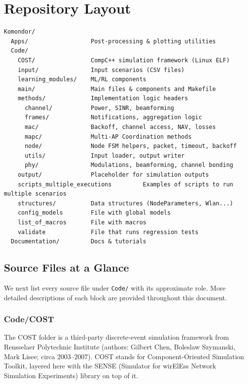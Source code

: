 \documentclass[11pt,a4paper]{article}
\begin{document}
\section{Repository Layout}
\label{sec:layout}

\begin{lstlisting}[language={},caption={Top-level directory tree.}]
Komondor/
  Apps/                  Post-processing & plotting utilities
  Code/
    COST/                CompC++ simulation framework (Linux ELF)
    input/               Input scenarios (CSV files)
    learning_modules/    ML/RL components
    main/                Main files & components and Makefile
    methods/             Implementation logic headers
      channel/           Power, SINR, beamforming
      frames/            Notifications, aggregation logic
      mac/               Backoff, channel access, NAV, losses
      mapc/              Multi-AP Coordination methods
      node/              Node FSM helpers, packet, timeout, backoff
      utils/             Input loader, output writer
      phy/               Modulations, beamforming, channel bonding
    output/              Placeholder for simulation outputs
    scripts_multiple_executions         Examples of scripts to run multiple scenarios
    structures/          Data structures (NodeParameters, Wlan...)
    config_models        File with global models
    list_of_macros       File with macros
    validate             File that runs regression tests
  Documentation/         Docs & tutorials
\end{lstlisting}

\subsection{Source Files at a Glance}

We next list every source file under \texttt{Code/} with its approximate role. More detailed descriptions of each block are provided throughout this document.

\subsubsection{Code/COST}

The COST folder is a third-party discrete-event simulation framework from Rensselaer Polytechnic Institute (authors: Gilbert Chen, Boleslaw Szymanski, Mark Lisee; circa 2003–2007). COST stands for Component-Oriented Simulation Toolkit, layered here with the SENSE (Simulator for wirElEss Network Simulation Experiments) library on top of it.
\end{document}
